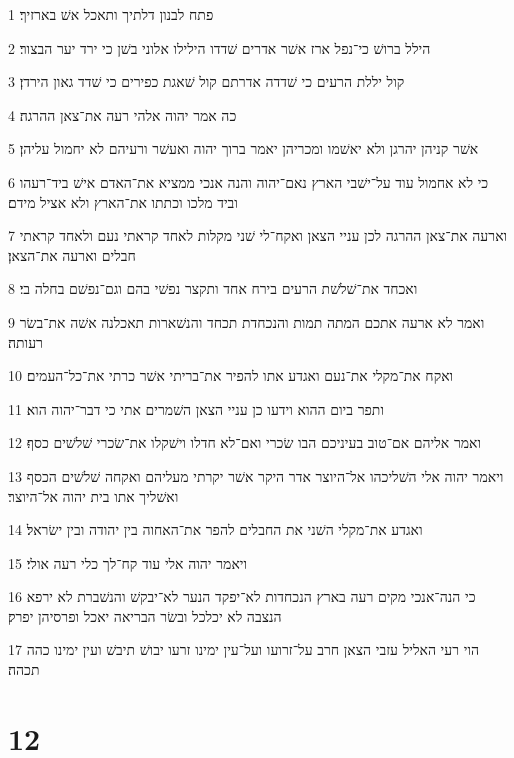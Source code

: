 \par 1 פתח לבנון דלתיך ותאכל אשׁ בארזיך׃
\par 2 הילל ברושׁ כי־נפל ארז אשׁר אדרים שׁדדו הילילו אלוני בשׁן כי ירד יער הבצור׃
\par 3 קול יללת הרעים כי שׁדדה אדרתם קול שׁאגת כפירים כי שׁדד גאון הירדן׃
\par 4 כה אמר יהוה אלהי רעה את־צאן ההרגה׃
\par 5 אשׁר קניהן יהרגן ולא יאשׁמו ומכריהן יאמר ברוך יהוה ואעשׁר ורעיהם לא יחמול עליהן׃
\par 6 כי לא אחמול עוד על־ישׁבי הארץ נאם־יהוה והנה אנכי ממציא את־האדם אישׁ ביד־רעהו וביד מלכו וכתתו את־הארץ ולא אציל מידם׃
\par 7 וארעה את־צאן ההרגה לכן עניי הצאן ואקח־לי שׁני מקלות לאחד קראתי נעם ולאחד קראתי חבלים וארעה את־הצאן׃
\par 8 ואכחד את־שׁלשׁת הרעים בירח אחד ותקצר נפשׁי בהם וגם־נפשׁם בחלה בי׃
\par 9 ואמר לא ארעה אתכם המתה תמות והנכחדת תכחד והנשׁארות תאכלנה אשׁה את־בשׂר רעותה׃
\par 10 ואקח את־מקלי את־נעם ואגדע אתו להפיר את־בריתי אשׁר כרתי את־כל־העמים׃
\par 11 ותפר ביום ההוא וידעו כן עניי הצאן השׁמרים אתי כי דבר־יהוה הוא׃
\par 12 ואמר אליהם אם־טוב בעיניכם הבו שׂכרי ואם־לא חדלו וישׁקלו את־שׂכרי שׁלשׁים כסף׃
\par 13 ויאמר יהוה אלי השׁליכהו אל־היוצר אדר היקר אשׁר יקרתי מעליהם ואקחה שׁלשׁים הכסף ואשׁליך אתו בית יהוה אל־היוצר׃
\par 14 ואגדע את־מקלי השׁני את החבלים להפר את־האחוה בין יהודה ובין ישׂראל׃
\par 15 ויאמר יהוה אלי עוד קח־לך כלי רעה אולי׃
\par 16 כי הנה־אנכי מקים רעה בארץ הנכחדות לא־יפקד הנער לא־יבקשׁ והנשׁברת לא ירפא הנצבה לא יכלכל ובשׂר הבריאה יאכל ופרסיהן יפרק׃
\par 17 הוי רעי האליל עזבי הצאן חרב על־זרועו ועל־עין ימינו זרעו יבושׁ תיבשׁ ועין ימינו כהה תכהה׃

\chapter{12}

